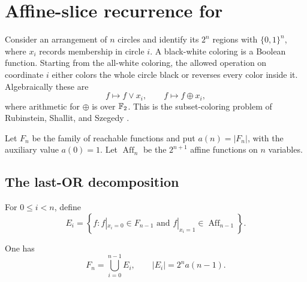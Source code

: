 \section{Affine-slice recurrence for \texorpdfstring{}{A005787}}
\label{sec:a005787}

Consider an arrangement of \(n\) circles and identify its \(2^n\) regions with
\(\{0,1\}^n\), where \(x_i\) records membership in circle \(i\).  A black-white
coloring is a Boolean function.  Starting from the all-white coloring, the
allowed operation on coordinate \(i\) either colors the whole circle black or
reverses every color inside it.  Algebraically these are
\begin{equation}
 f\longmapsto f\lor x_i,
 \qquad
 f\longmapsto f\oplus x_i,
 \label{eq:a005787-ops}
\end{equation}
where arithmetic for \(\oplus\) is over \(\mathbb{F}_2\).  This is the subset-coloring
problem of Rubinstein, Shallit, and Szegedy
\citep{RubinsteinShallitSzegedy1988}.

Let \(F_n\) be the family of reachable functions and put
\(a(n)=|F_n|\), with the auxiliary value \(a(0)=1\).  Let
\(\operatorname{Aff}_n\) be the \(2^{n+1}\) affine functions on \(n\) variables.

\subsection{The last-OR decomposition}

For \(0\le i<n\), define
\begin{equation}
 E_i=\left\{f:
 f|_{x_i=0}\in F_{n-1}
 \text{ and }
 f|_{x_i=1}\in\operatorname{Aff}_{n-1}
 \right\}.
 \label{eq:a005787-E}
\end{equation}

\begin{lemma}
\label{lem:a005787-union}
One has
\begin{equation}
 F_n=\bigcup_{i=0}^{n-1}E_i,
 \qquad
 |E_i|=2^n a(n-1).
 \label{eq:a005787-union}
\end{equation}
\end{lemma}

